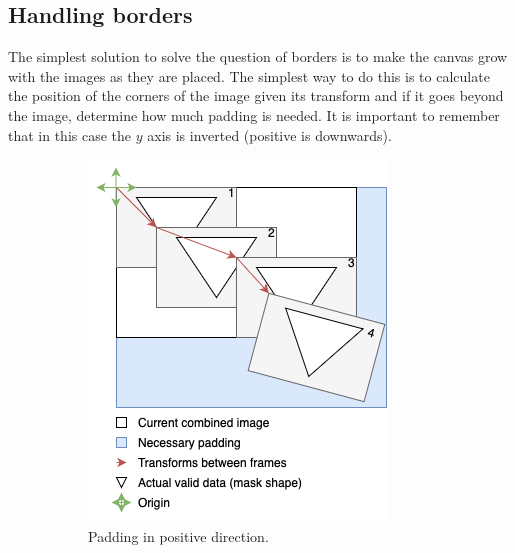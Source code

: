 \subsection{Handling borders}
The simplest solution to solve the question of borders is to make the canvas grow with the images as they are placed. The simplest way to do this is to calculate the position of the corners of the image given its transform and if it goes beyond the image, determine how much padding is needed. It is important to remember that in this case the \(y\) axis is inverted (positive is downwards).

\begin{figure}[H]
    \centering
    \begin{subfigure}[b]{.45\textwidth}
        \centering
        \includegraphics[width=\textwidth]{figures/mosaicing/Mosaicing.png}
        \caption{Padding in positive direction.}
        \label{sfig:mosaic-positive}
    \end{subfigure}
    \hfill
    \begin{subfigure}[b]{.45\textwidth}
        \centering

\end{subfigure}
\end{figure}
